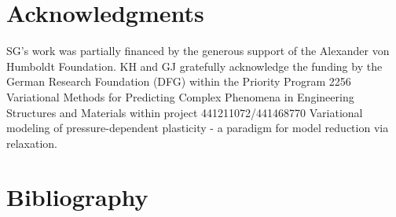 \documentclass[final,1p,times]{elsarticle}
\begin{document}
\section*{Acknowledgments}
SG's work was partially financed by the generous support of the Alexander von Humboldt Foundation.
KH and GJ gratefully acknowledge the funding by the German Research
Foundation (DFG) within the Priority Program 2256 Variational Methods
for Predicting Complex Phenomena in Engineering Structures and
Materials within project 441211072/441468770 Variational modeling of
pressure-dependent plasticity - a paradigm for model reduction via relaxation.

%

\section*{Bibliography}






%



\end{document}
